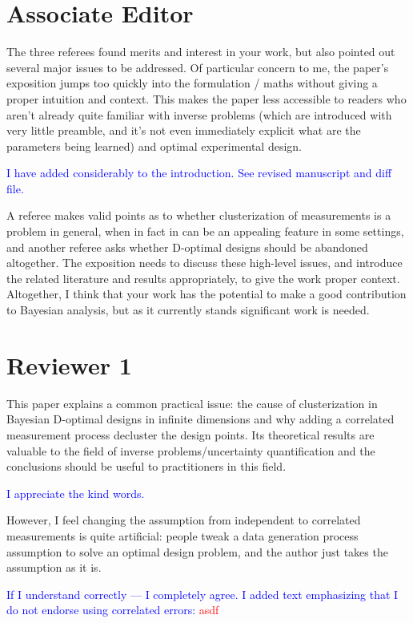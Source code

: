 \documentclass{amsart}
\newcommand{\paste}[1]{\vskip 0.05in \textcolor{red}{#1}\vskip 0.05in}
\newcommand{\answer}[1]{\vskip 0.05in \textcolor{blue}{#1} \vskip 0.05in}
\begin{document}
\section{Associate Editor}
The three referees found merits and interest in your work, but also
pointed out several major issues to be addressed. Of particular
concern to me, the paper's exposition jumps too quickly into the
formulation / maths without giving a proper intuition and
context. This makes the paper less accessible to readers who aren't
already quite familiar with inverse problems (which are introduced
with very little preamble, and it's not even immediately explicit what
are the parameters being learned) and optimal experimental design.

\answer{I have added considerably to the introduction. See revised
manuscript and diff file.}

A referee makes valid points as to whether clusterization of
measurements is a problem in general, when in fact in can be an
appealing feature in some settings, and another referee asks whether
D-optimal designs should be abandoned altogether. The exposition
needs to discuss these high-level issues, and introduce the related
literature and results appropriately, to give the work proper
context. Altogether, I think that your work has the potential to make
a good contribution to Bayesian analysis, but as it currently stands
significant work is needed.



\section{Reviewer 1}
This paper explains a common practical issue: the cause of
clusterization in Bayesian D-optimal designs in infinite dimensions
and why adding a correlated measurement process decluster the design
points. Its theoretical results are valuable to the field of inverse
problems/uncertainty quantification and the conclusions should be
useful to practitioners in this field.

\answer{I appreciate the kind words.}

However, I feel changing the assumption from independent to correlated
measurements is quite artificial: people tweak a data generation
process assumption to solve an optimal design problem, and the author
just takes the assumption as it is.

\answer{If I understand correctly --- I completely agree. I added
text emphasizing that I do not endorse using correlated errors:}
\paste{asdf}
\end{document}
